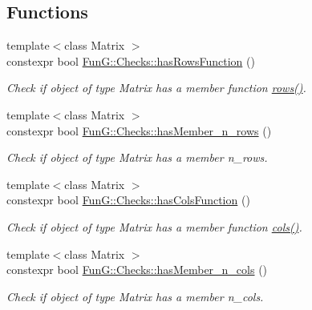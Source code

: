 \subsection*{Functions}
\begin{DoxyCompactItemize}
\item 
{\footnotesize template$<$class Matrix $>$ }\\constexpr bool \hyperlink{namespaceFunG_1_1Checks_a45a54dc6fc2c1d24a88be78a79a5a72c}{Fun\+G\+::\+Checks\+::has\+Rows\+Function} ()
\begin{DoxyCompactList}\small\item\em Check if object of type Matrix has a member function \hyperlink{namespaceFunG_1_1LinearAlgebra_abd3afa2fcd2194787342b2662cfa9f5a}{rows()}. \end{DoxyCompactList}\item 
{\footnotesize template$<$class Matrix $>$ }\\constexpr bool \hyperlink{namespaceFunG_1_1Checks_ae4d420ada8ff4b411cd351645325125e}{Fun\+G\+::\+Checks\+::has\+Member\+\_\+n\+\_\+rows} ()
\begin{DoxyCompactList}\small\item\em Check if object of type Matrix has a member n\+\_\+rows. \end{DoxyCompactList}\item 
{\footnotesize template$<$class Matrix $>$ }\\constexpr bool \hyperlink{namespaceFunG_1_1Checks_a3da195bf2a00ee02d12b19857723cb34}{Fun\+G\+::\+Checks\+::has\+Cols\+Function} ()
\begin{DoxyCompactList}\small\item\em Check if object of type Matrix has a member function \hyperlink{namespaceFunG_1_1LinearAlgebra_ae981b8bee32eea3ce87f41874835c9c1}{cols()}. \end{DoxyCompactList}\item 
{\footnotesize template$<$class Matrix $>$ }\\constexpr bool \hyperlink{namespaceFunG_1_1Checks_aa93bc7629b88570df808e580ab436d8c}{Fun\+G\+::\+Checks\+::has\+Member\+\_\+n\+\_\+cols} ()
\begin{DoxyCompactList}\small\item\em Check if object of type Matrix has a member n\+\_\+cols. \end{DoxyCompactList}\end{DoxyCompactItemize}
